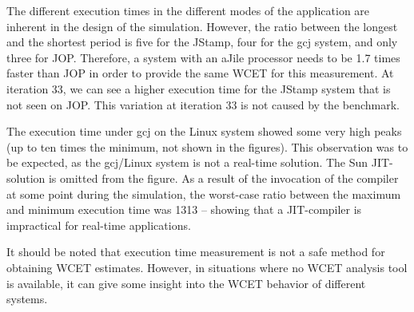 The different execution times in the different modes of the
application are inherent in the design of the simulation. However,
the ratio between the longest and the shortest period is five for the
JStamp, four for the gcj system, and only three for JOP. Therefore, a
system with an aJile processor needs to be 1.7 times faster than JOP
in order to provide the same WCET for this measurement. At iteration
33, we can see a higher execution time for the JStamp system that is
not seen on JOP. This variation at iteration 33 is not caused by the
benchmark.

The execution time under gcj on the Linux system showed some very
high peaks (up to ten times the minimum, not shown in the figures).
This observation was to be expected, as the gcj/Linux system is not
a real-time solution. The Sun JIT-solution is omitted from the
figure. As a result of the invocation of the compiler at some point
during the simulation, the worst-case ratio between the maximum and
minimum execution time was 1313 -- showing that a JIT-compiler is
impractical for real-time applications.

It should be noted that execution time measurement is not a safe
method for obtaining WCET estimates. However, in situations where no
WCET analysis tool is available, it can give some insight into the
WCET behavior of different systems.


